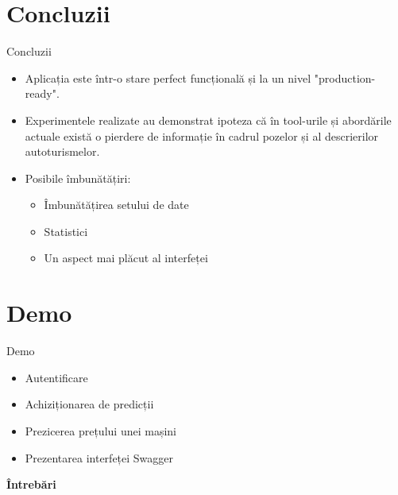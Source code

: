 \documentclass[aspectratio=169]{beamer}
\begin{document}
\section{Concluzii}
\begin{frame}{Concluzii}
    \begin{itemize}
        \item Aplicația este într-o stare perfect funcțională și la un nivel "production-ready".
        \item Experimentele realizate au demonstrat ipoteza că în tool-urile și abordările actuale există o pierdere de informație în cadrul pozelor și al descrierilor autoturismelor. 
        \vspace{10pt}
        \item Posibile îmbunătățiri:
        \begin{itemize}
            \item Îmbunătățirea setului de date
            \item Statistici
            \item Un aspect mai plăcut al interfeței
        \end{itemize}
        
    \end{itemize}
    
\end{frame}

\section{Demo}

\begin{frame}{Demo}
    \begin{itemize}
        \item Autentificare
        \item Achiziționarea de predicții
        \item Prezicerea prețului unei mașini
        \item Prezentarea interfeței Swagger
    \end{itemize}
\end{frame}

\begin{frame}
    \centering
    \textbf{\Huge Întrebări}
\end{frame}

\end{document}
